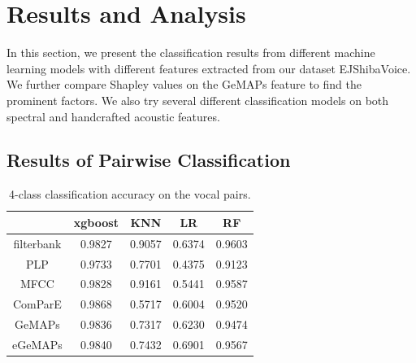 \section{Results and Analysis}
\label{sec:results}

In this section, we present the classification results from different machine learning models with different features extracted from our dataset EJShibaVoice. We further compare Shapley values on the GeMAPs feature to find the prominent factors. We also try several different classification models on both spectral and handcrafted acoustic features.

\subsection{Results of Pairwise Classification}
\label{sec:main}
\begin{table}[th]
	\small
	\centering
	\begin{tabular}{l|l|c|c|c|c}
		\toprule
		\multicolumn{2}{c|}{}            & xgboost & KNN  & LR   & RF  \\
		\midrule
		\multicolumn{2}{c|}{filterbank}          & 0.9827        & 0.9057         & 0.6374    & 0.9603    \\
		\multicolumn{2}{c|}{PLP} & 0.9733 & 0.7701 & 0.4375 & 0.9123\\
		\multicolumn{2}{c|}{MFCC} & 0.9828 & 0.9161 & 0.5441 & 0.9587\\
		\multicolumn{2}{c|}{ComParE} & {0.9868} & {0.5717} & {0.6004} & {0.9520}\\
		\multicolumn{2}{c|}{GeMAPs} & 0.9836 & 0.7317 & 0.6230 & 0.9474 \\
		\multicolumn{2}{c|}{eGeMAPs} & 0.9840 & 0.7432 & 0.6901 & 0.9567\\

		\bottomrule
	\end{tabular}
	\caption{4-class classification accuracy on the vocal pairs.}
	\label{table:mainresult}
\end{table}


